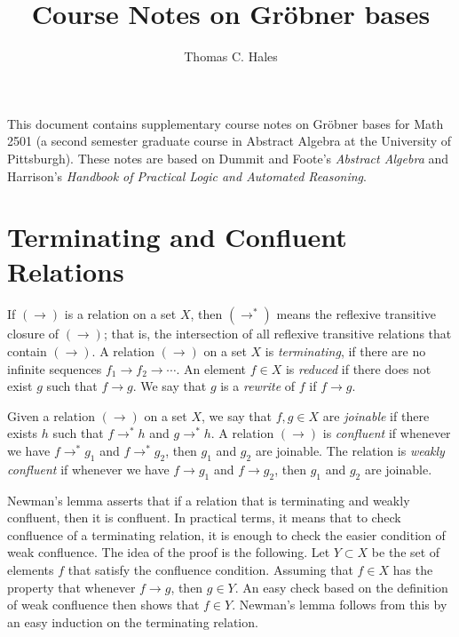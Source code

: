 \documentclass{llncs}
\def\op#1{{\hbox{#1}}}
\begin{document}
\title{Course Notes on Gr\"obner bases}
\author{Thomas C. Hales}
\maketitle

\def\ra{\rightarrow}
\def\ras{\rightarrow^*}
\def\LT{\op{LT}}

This document contains supplementary course notes on Gr\"obner bases for Math 2501 (a second semester graduate course in Abstract Algebra at the University of Pittsburgh).  These notes are based on Dummit and Foote's {\it Abstract Algebra} and Harrison's {\it Handbook of Practical Logic and Automated Reasoning}.


\section{Terminating and Confluent Relations}


If $(\ra)$ is a relation on a set $X$, then $(\ras)$ means the reflexive transitive closure of $(\ra)$; that is, the intersection of all reflexive transitive relations that contain $(\ra)$.  
A relation $(\ra)$ on a set $X$ is {\it terminating}, if there are no infinite sequences $f_1\ra f_2\ra \cdots$.
An element $f\in X$ is
{\it reduced} if there does not exist $g$ such that $f\ra g$.
We say that $g$ is a {\it rewrite} of $f$ if $f\ra g$.


Given a relation $(\ra)$ on a set $X$, we say that $f, g\in X$ are {\it joinable} if there exists $h$ such that $f\ras h$ and $g\ras h$.
A relation $(\ra)$ is {\it confluent} if whenever we have $f\ras g_1$ and $f\ras g_2$, then $g_1$ and $g_2$ are joinable.  The relation is {\it weakly confluent} if whenever we have
$f\ra g_1$ and $f\ra g_2$, then $g_1$ and $g_2$ are joinable.  

Newman's lemma asserts that if a relation that is terminating and weakly confluent, then it is confluent.  In practical terms, it means that to check confluence of a terminating relation, it is enough to check the easier condition of weak confluence.   The idea of the proof is the following.   Let $Y\subset X$ be the set of elements $f$ that satisfy the confluence condition.  Assuming that  $f\in X$ has the property that whenever $f\ra g$, then $g\in Y$.   An easy check based on the definition of weak confluence then shows that $f\in Y$.  Newman's lemma follows from this by an easy induction on the terminating relation.
\end{document}
